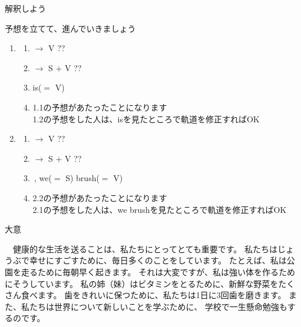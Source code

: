 \documentclass[aspectratio=169,xcolor={dvipsnames,table}]{beamer}
\begin{document}
\begin{frame}[plain]{解釈しよう}
 \large

予想を立てて、進んでいきましょう

\begin{enumerate}
 \item<2-> \begin{enumerate}
	\item<2->  $\longrightarrow$ V ??
	\item<2->  $\longrightarrow$ S $+$ V ??
	\item<3->  \hspace{3pt}is($=$ V)\
	\item<5-> 1.1の予想があたったことになります\\
	      1.2の予想をした人は、isを見たところで軌道を修正すればOK
       \end{enumerate}
 \item<4-> \begin{enumerate}
	\item<6->  $\longrightarrow$ V ??
	\item<6->  $\longrightarrow$ S $+$ V ??
	\item<7-> \fbox{To keep \ldots}\,,\hspace{3pt} we($=$ S)\hspace{3pt} brush($=$ V)
	\item<8-> 2.2の予想があたったことになります\\
	      2.1の予想をした人は、we brushを見たところで軌道を修正すればOK

       \end{enumerate}
 

\end{enumerate}
\end{frame}
\begin{frame}[plain]{大意}
 
\begin{tcolorbox}
　健康的な生活を送ることは、私たちにとってとても重要です。
私たちはじょうぶで幸せにすごすために、毎日多くのことをしています。
たとえば、私は公園を走るために毎朝早く起きます。
それは大変ですが、私は強い体を作るためにそうしています。
私の姉（妹）はビタミンをとるために、新鮮な野菜をたくさん食べます。
歯をきれいに保つために、私たちは1日に3回歯を磨きます。
また、私たちは世界について新しいことを学ぶために、
学校で一生懸命勉強もするのです。
\end{tcolorbox}

\end{frame}
\end{document}
